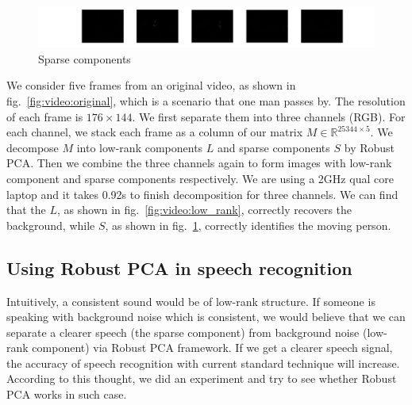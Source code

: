 \documentclass{../../common/projectreport}
\begin{document}
\begin{figure}[hb]
  \centering
  \includegraphics[width=1\textwidth]{SwitchLight_sparse.jpg}
  \caption{Sparse components}
  \label{fig:video:sparse}
\end{figure}

We consider five frames from an original video, as shown in fig.~\ref{fig:video:original}, which is a scenario that  one man passes by. The resolution of each frame is $176\times144$. We first separate them into three channels (RGB). For each channel, we stack each frame as a column  of our matrix $M\in\mathbb{R}^{25344\times5}$. We decompose $M$ into low-rank components $L$ and sparse components $S$ by Robust PCA. Then we combine the three channels again to form images with low-rank component and sparse components respectively. We are using a 2GHz qual core laptop and it takes 0.92s to finish decomposition for three channels. We can find that the $L$, as shown in fig.~\ref{fig:video:low_rank}, correctly recovers the background, while $S$, as shown in fig.~\ref{fig:video:sparse}, correctly identifies the moving person.

\subsection{Using Robust PCA in speech recognition}
Intuitively, a consistent sound would be of low-rank structure. If someone is speaking with background noise which is consistent, we would believe that we can separate a clearer speech (the sparse component) from background noise (low-rank component) via Robust PCA framework. If we get a clearer speech signal, the accuracy of speech recognition with current standard technique will increase. According to this thought, we did an experiment and try to see whether Robust PCA works in such case.
\end{document}
